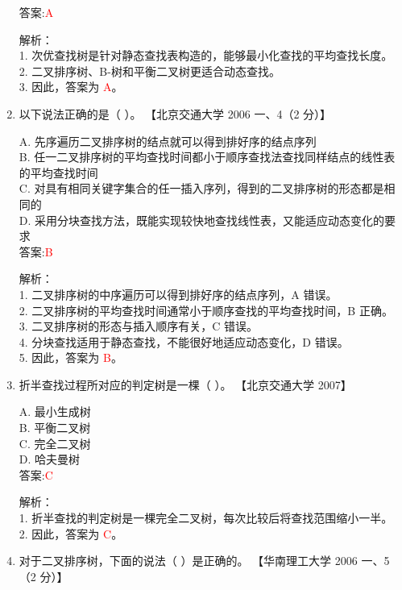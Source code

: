 \documentclass[lang=cn,newtx,10pt,scheme=chinese]{../../../elegantbook}
\begin{document}
\begin{enumerate}
    答案:\textcolor{red}{A}

    解析：\\
    1. 次优查找树是针对静态查找表构造的，能够最小化查找的平均查找长度。\\
    2. 二叉排序树、B-树和平衡二叉树更适合动态查找。\\
    3. 因此，答案为 \textcolor{red}{A}。\\

\item 以下说法正确的是（ ）。  
    【北京交通大学 2006 一、4（2 分）】  

    A. 先序遍历二叉排序树的结点就可以得到排好序的结点序列 \\  
    B. 任一二叉排序树的平均查找时间都小于顺序查找法查找同样结点的线性表的平均查找时间 \\  
    C. 对具有相同关键字集合的任一插入序列，得到的二叉排序树的形态都是相同的 \\  
    D. 采用分块查找方法，既能实现较快地查找线性表，又能适应动态变化的要求 \\  

    答案:\textcolor{red}{B}

    解析：\\
    1. 二叉排序树的中序遍历可以得到排好序的结点序列，A 错误。\\
    2. 二叉排序树的平均查找时间通常小于顺序查找的平均查找时间，B 正确。\\
    3. 二叉排序树的形态与插入顺序有关，C 错误。\\
    4. 分块查找适用于静态查找，不能很好地适应动态变化，D 错误。\\
    5. 因此，答案为 \textcolor{red}{B}。\\

\item 折半查找过程所对应的判定树是一棵（ ）。  
    【北京交通大学 2007】  

    A. 最小生成树 \\  
    B. 平衡二叉树 \\  
    C. 完全二叉树 \\  
    D. 哈夫曼树 \\  

    答案:\textcolor{red}{C}

    解析：\\
    1. 折半查找的判定树是一棵完全二叉树，每次比较后将查找范围缩小一半。\\
    2. 因此，答案为 \textcolor{red}{C}。\\

\item 对于二叉排序树，下面的说法（ ）是正确的。  
    【华南理工大学 2006 一、5（2 分）】  


\end{enumerate}
\end{document}
